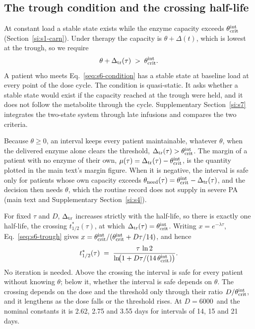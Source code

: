 \subsection{The trough condition and the crossing half-life}
\label{si:s6:crossing}

At constant load a stable state exists while the enzyme capacity exceeds $\theta_{\mathrm{crit}}^{\mathrm{int}}$
(Section~\ref{si:s1-carn}). Under therapy the capacity is $\theta+\Delta(t)$, which is lowest at
the trough, so we require
\begin{equation}
\label{seq:s6-condition}
\theta+\Delta_{\mathrm{tr}}(\tau)\;>\;\theta_{\mathrm{crit}}^{\mathrm{int}} .
\end{equation}
A patient who meets Eq.~\eqref{seq:s6-condition} has a stable state at baseline load at every
point of the dose cycle. The condition is quasi-static. It asks whether a stable state would
exist if the capacity reached at the trough were held, and it does not follow the metabolite
through the cycle. Supplementary Section~\ref{si:s7} integrates the two-state system through
late infusions and compares the two criteria.

Because $\theta\ge0$, an interval keeps every patient maintainable, whatever $\theta$, when the
delivered enzyme alone clears the threshold, $\Delta_{\mathrm{tr}}(\tau)>\theta_{\mathrm{crit}}^{\mathrm{int}}$. The margin of a patient with no
enzyme of their own, $\mu(\tau)=\Delta_{\mathrm{tr}}(\tau)-\theta_{\mathrm{crit}}^{\mathrm{int}}$, is the quantity plotted in the main text's
margin figure. When it is negative, the interval is safe only for patients whose own capacity
exceeds $\theta_{\mathrm{need}}(\tau)=\theta_{\mathrm{crit}}^{\mathrm{int}}-\Delta_{\mathrm{tr}}(\tau)$, and the decision then needs $\theta$,
which the routine record does not supply in severe PA (main text and Supplementary
Section~\ref{si:s4}).

For fixed $\tau$ and $D$, $\Delta_{\mathrm{tr}}$ increases strictly with the half-life, so there is exactly one
half-life, the crossing $t_{1/2}^{\ast}(\tau)$, at which $\Delta_{\mathrm{tr}}(\tau)=\theta_{\mathrm{crit}}^{\mathrm{int}}$. Writing
$x=e^{-\lambda\tau}$, Eq.~\eqref{seq:s6-trough} gives $x=\theta_{\mathrm{crit}}^{\mathrm{int}}/(\theta_{\mathrm{crit}}^{\mathrm{int}}+D\tau/14)$, and hence
\begin{equation}
\label{seq:s6-cross}
t_{1/2}^{\ast}(\tau)\;=\;\frac{\tau\,\ln2}{\ln\!\bigl(1+D\tau/(14\,\theta_{\mathrm{crit}}^{\mathrm{int}})\bigr)} .
\end{equation}
No iteration is needed. Above the crossing the interval is safe for every patient without
knowing $\theta$; below it, whether the interval is safe depends on $\theta$. The crossing depends on the dose and the threshold only through their ratio
$D/\theta_{\mathrm{crit}}^{\mathrm{int}}$, and it lengthens as the dose falls or the threshold rises. At $D=6000$\um\ and the
nominal constants it is 2.62, 2.75 and 3.55 days for intervals of 14, 15 and 21 days.

